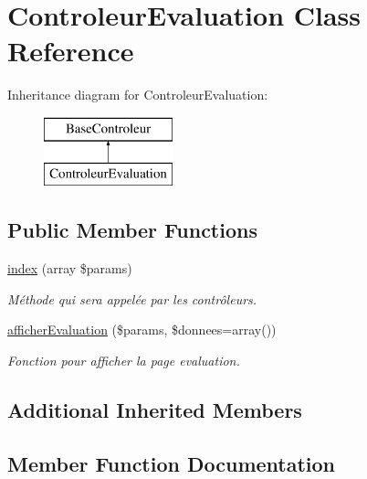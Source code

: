 \hypertarget{class_controleur_evaluation}{}\section{Controleur\+Evaluation Class Reference}
\label{class_controleur_evaluation}
Inheritance diagram for Controleur\+Evaluation\+:\begin{figure}[H]
\begin{center}
\leavevmode
\includegraphics[height=2.000000cm]{class_controleur_evaluation}
\end{center}
\end{figure}
\subsection*{Public Member Functions}
\begin{DoxyCompactItemize}
\item 
\hyperlink{class_controleur_evaluation_ae501bf1013f7f16c03f8a57b47ae82ed}{index} (array \$params)
\begin{DoxyCompactList}\small\item\em Méthode qui sera appelée par les contrôleurs. \end{DoxyCompactList}\item 
\hyperlink{class_controleur_evaluation_a9326b36e27164186c2a2d28bba79e810}{afficher\+Evaluation} (\$params, \$donnees=array())
\begin{DoxyCompactList}\small\item\em Fonction pour afficher la page evaluation. \end{DoxyCompactList}\end{DoxyCompactItemize}
\subsection*{Additional Inherited Members}


\subsection{Member Function Documentation}
\mbox{\label{class_controleur_evaluation_a9326b36e27164186c2a2d28bba79e810}} 
